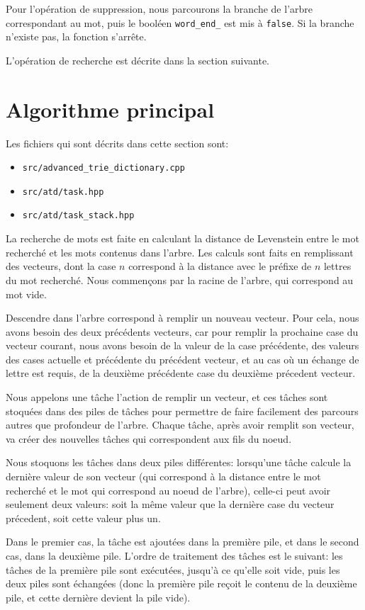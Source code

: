 \documentclass{article}
\begin{document}
Pour l'opération de suppression, nous parcourons la branche de l'arbre correspondant
au mot, puis le booléen \texttt{word\_end\_} est mis à \texttt{false}. Si la
branche n'existe pas, la fonction s'arrête.

L'opération de recherche est décrite dans la section suivante.

\section{Algorithme principal}

Les fichiers qui sont décrits dans cette section sont:
\begin{itemize}
	\item \texttt{src/advanced\_trie\_dictionary.cpp}
	\item \texttt{src/atd/task.hpp}
	\item \texttt{src/atd/task\_stack.hpp}
\end{itemize}

La recherche de mots est faite en calculant la distance de Levenstein entre le
mot recherché et les mots contenus dans l'arbre. Les calculs sont faits en
remplissant des vecteurs, dont la case $n$ correspond à la distance avec le
préfixe de $n$ lettres du mot recherché. Nous commençons par la racine de
l'arbre, qui correspond au mot vide.

Descendre dans l'arbre correspond à remplir un nouveau vecteur. Pour cela,
nous avons besoin des deux précédents vecteurs, car pour remplir la prochaine
case du vecteur courant, nous avons besoin de la valeur de la case précédente,
des valeurs des cases actuelle et précédente du précédent vecteur, et au cas
où un échange de lettre est requis, de la deuxième précédente case du deuxième
précedent vecteur.

Nous appelons une tâche l'action de remplir un vecteur, et ces tâches sont
stoquées dans des piles de tâches pour permettre de faire facilement des
parcours autres que profondeur de l'arbre. Chaque tâche, après avoir remplit
son vecteur, va créer des nouvelles tâches qui correspondent aux fils du noeud.

Nous stoquons les tâches dans deux piles différentes: lorsqu'une tâche calcule
la dernière valeur de son vecteur (qui correspond à la distance entre le mot
recherché et le mot qui correspond au noeud de l'arbre), celle-ci peut avoir
seulement deux valeurs: soit la même valeur que la dernière case du vecteur
précedent, soit cette valeur plus un.

Dans le premier cas, la tâche est ajoutées dans la première pile, et dans le
second cas, dans la deuxième pile. L'ordre de traitement des tâches est le
suivant: les tâches de la première pile sont exécutées, jusqu'à ce qu'elle soit
vide, puis les deux piles sont échangées (donc la première pile reçoit le contenu
de la deuxième pile, et cette dernière devient la pile vide).
\end{document}
